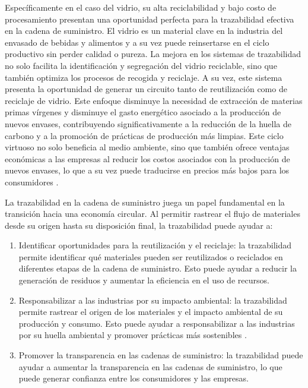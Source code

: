 \documentclass[main.tex]{subfiles}
\begin{document}
Específicamente en el caso del vidrio, su alta reciclabilidad y bajo costo de procesamiento \cite{prodvidrio2024verallia} presentan una oportunidad perfecta para la trazabilidad efectiva en la cadena de suministro. El vidrio es un material clave en la industria del envasado de bebidas y alimentos y a su vez puede reinsertarse en el ciclo productivo sin perder calidad o pureza. La mejora en los sistemas de trazabilidad no solo facilita la identificación y segregación del vidrio reciclable, sino que también optimiza los procesos de recogida y reciclaje. A su vez, este sistema presenta la oportunidad de generar un circuito tanto de reutilización como de reciclaje de vidrio. Este enfoque disminuye la necesidad de extracción de materias primas vírgenes y disminuye el gasto energético asociado a la producción de nuevos envases, contribuyendo significativamente a la reducción de la huella de carbono y a la promoción de prácticas de producción más limpias. Este ciclo virtuoso no solo beneficia al medio ambiente, sino que también ofrece ventajas económicas a las empresas al reducir los costos asociados con la producción de nuevos envases, lo que a su vez puede traducirse en precios más bajos para los consumidores \cite{prodvidrio2024verallia}.

La trazabilidad en la cadena de suministro juega un papel fundamental en la transición hacia una economía circular. Al permitir rastrear el flujo de materiales desde su origen hasta su disposición final, la trazabilidad puede ayudar a:

\begin{enumerate}
	\item Identificar oportunidades para la reutilización y el reciclaje: la trazabilidad permite identificar qué materiales pueden ser reutilizados o reciclados en diferentes etapas de la cadena de suministro. Esto puede ayudar a reducir la generación de residuos y aumentar la eficiencia en el uso de recursos.

	\item Responsabilizar a las industrias por su impacto ambiental: la trazabilidad permite rastrear el origen de los materiales y el impacto ambiental de su producción y consumo. Esto puede ayudar a responsabilizar a las industrias por su huella ambiental y promover prácticas más sostenibles \cite{melendez2021economia}.

	\item Promover la transparencia en las cadenas de suministro: la trazabilidad puede ayudar a aumentar la transparencia en las cadenas de suministro, lo que puede generar confianza entre los consumidores y las empresas.
\end{enumerate}
\end{document}
